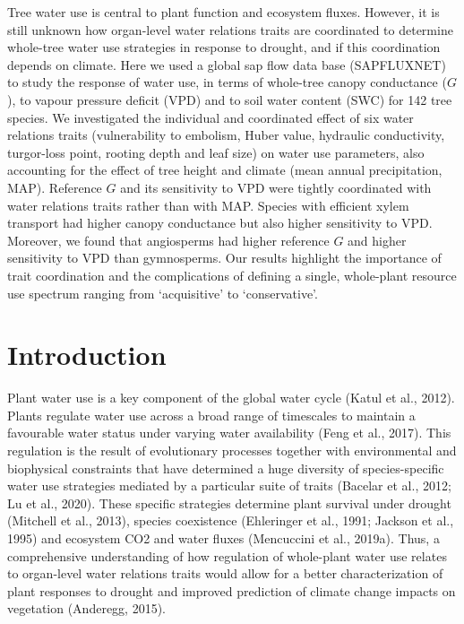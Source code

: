 \documentclass[11pt,twoside]{reedthesis}
\begin{document}
Tree water use is central to plant function and ecosystem fluxes.
However, it is still unknown how organ-level water relations traits are
coordinated to determine whole-tree water use strategies in response to
drought, and if this coordination depends on climate. Here we used a
global sap flow data base (SAPFLUXNET) to study the response of water
use, in terms of whole-tree canopy conductance (\(G\)), to vapour
pressure deficit (VPD) and to soil water content (SWC) for 142 tree
species. We investigated the individual and coordinated effect of six
water relations traits (vulnerability to embolism, Huber value,
hydraulic conductivity, turgor-loss point, rooting depth and leaf size)
on water use parameters, also accounting for the effect of tree height
and climate (mean annual precipitation, MAP). Reference \(G\) and its
sensitivity to VPD were tightly coordinated with water relations traits
rather than with MAP. Species with efficient xylem transport had higher
canopy conductance but also higher sensitivity to VPD. Moreover, we
found that angiosperms had higher reference \(G\) and higher sensitivity
to VPD than gymnosperms. Our results highlight the importance of trait
coordination and the complications of defining a single, whole-plant
resource use spectrum ranging from `acquisitive' to `conservative'.\par
\newpage

\section{Introduction}\label{introduction}

Plant water use is a key component of the global water cycle (Katul et
al., 2012). Plants regulate water use across a broad range of timescales
to maintain a favourable water status under varying water availability
(Feng et al., 2017). This regulation is the result of evolutionary
processes together with environmental and biophysical constraints that
have determined a huge diversity of species-specific water use
strategies mediated by a particular suite of traits (Bacelar et al.,
2012; Lu et al., 2020). These specific strategies determine plant
survival under drought (Mitchell et al., 2013), species coexistence
(Ehleringer et al., 1991; Jackson et al., 1995) and ecosystem CO2 and
water fluxes (Mencuccini et al., 2019a). Thus, a comprehensive
understanding of how regulation of whole-plant water use relates to
organ-level water relations traits would allow for a better
characterization of plant responses to drought and improved prediction
of climate change impacts on vegetation (Anderegg, 2015).\par
\end{document}
